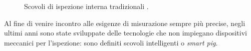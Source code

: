 \begin{figure}[htbp]
    \centering
     \qquad
\caption{Scovoli di ispezione interna tradizionali \parencite{williamson2015guide}.}
\label{fig:internalinspection}
\end{figure}

Al fine di venire incontro alle esigenze di misurazione sempre più precise, negli ultimi anni sono state sviluppate delle tecnologie che non impiegano dispositivi meccanici per l'ispezione: sono definiti scovoli intelligenti o \textit{smart pig}.

